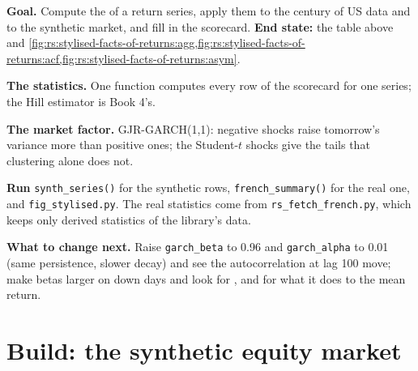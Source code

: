 \begin{tutorial}
\textbf{Goal.} Compute the  of a return series, apply them to the century of US data and to the synthetic market,
and fill in the scorecard. \textbf{End state:} the table above and
\cref{fig:rs:stylised-facts-of-returns:agg,fig:rs:stylised-facts-of-returns:acf,fig:rs:stylised-facts-of-returns:asym}.
\begin{tutsteps}
\item \textbf{The statistics.} One function computes every row of the scorecard for one series; the Hill estimator is Book 4's.
\label{lst:rs:stylised-facts-of-returns:facts}
\item \textbf{The market factor.} GJR-GARCH(1,1): negative shocks raise tomorrow's variance more than positive ones; the
Student-$t$ shocks give the tails that clustering alone does not.
\label{lst:rs:stylised-facts-of-returns:garch}
\item \textbf{Run} \texttt{synth\_series()} for the synthetic rows, \texttt{french\_summary()} for the real one, and
\texttt{fig\_stylised.py}. The real statistics come from \texttt{rs\_fetch\_french.py}, which keeps only derived statistics of the
library's data.
\end{tutsteps}
\textbf{What to change next.} Raise \texttt{garch\_beta} to 0.96 and \texttt{garch\_alpha} to 0.01 (same persistence, slower
decay) and see the autocorrelation at lag 100 move; make betas larger on down days and look for , and for what
it does to the mean return.
\end{tutorial}

\section{Build: the synthetic equity market}\label{bld:rs:stylised-facts-of-returns:synthmkt}

